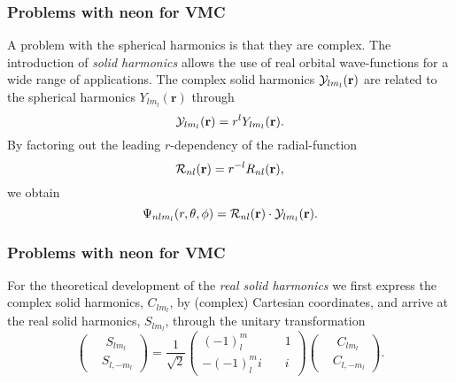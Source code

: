 \frame
{
  \frametitle{Problems with neon for VMC}
\begin{small}
{\scriptsize
A problem with the spherical harmonics is that they are complex. The introduction of
\emph{solid harmonics} allows the use
of real orbital wave-functions for a wide range of applications. The
complex solid harmonics ${\cal Y}_{lm_l}(\mathbf{r})$ are related to
the spherical harmonics  $Y_{lm_l}(\mathbf{r})$ through
\begin{equation*}
  {\cal Y}_{lm_l}(\mathbf{r}) = r^l Y_{lm_l}(\mathbf{r}).
\end{equation*}
By factoring out the leading $r$-dependency of the radial-function
\begin{equation*}
  {\cal R}_{nl}(\mathbf{r}) = r^{-l} R_{nl}(\mathbf{r}),
\end{equation*}
we obtain 
\begin{equation*}
  \Psi_{nlm_l}(r,\theta, \phi) %
  = {\cal R}_{nl}(\mathbf{r})\cdot{\cal Y}_{lm_l}(\mathbf{r}).
\end{equation*}
}
\end{small}
}










\frame
{
  \frametitle{Problems with neon for VMC}
\begin{small}
{\scriptsize
For the theoretical development of the \emph{real solid harmonics} we first 
express the complex solid harmonics, $C_{lm_l}$, by (complex) Cartesian
coordinates, and arrive at the real solid harmonics, $S_{lm_l}$, through
the unitary transformation
\begin{equation*}
  \left( \begin{split} &\phantom{i} S_{lm_l} \\ 
    &S_{l,-m_l} \end{split} \right) 
  = \frac{1}{\sqrt{2}} \left(        \begin{split}
    (-1)^m_l \phantom{a} & \phantom{aa} 1 \\ 
    -(-1)^m_l i & \phantom{aa} i       \end{split} \right)  
  \left( \begin{split} &\phantom{i} C_{lm_l} \\ 
    &C_{l,-m_l} \end{split} \right).
\end{equation*}
}
\end{small}
}



